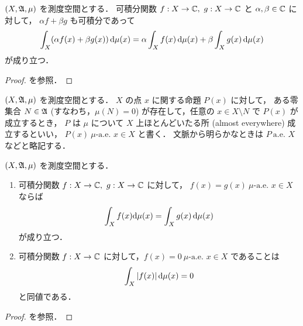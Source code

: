 \begin{theorem}
    $(X,\mathfrak{A},\mu)$ を測度空間とする．
    可積分関数 $f:X\to\Cbb,\ g:X\to\Cbb$ と $\alpha,\beta\in\mathbb{C}$ に対して，
    $\alpha f+\beta g$ も可積分であって
    \begin{align*}
        \int_X(\alpha f(x)+\beta g(x))\,\mathrm{d}\mu(x)
        =\alpha\int_Xf(x)\,\mathrm{d}\mu(x)+\beta\int_Xg(x)\,\mathrm{d}\mu(x)
    \end{align*}
    が成り立つ．
\end{theorem}

\begin{proof}
    \cite[定理 12.3, 系 1]{It63} を参照．
\end{proof}

\begin{definition}
    $(X,\mathfrak{A},\mu)$ を測度空間とする．
    $X$ の点 $x$ に関する命題 $P(x)$ に対して，
    ある零集合 $N\in\mathfrak{A}$ (すなわち，$\mu(N)=0$) が存在して，任意の $x\in X\setminus N$ で $P(x)$ が成立するとき，
    $P$ は $\mu$ について $X$ 上ほとんどいたる所 (almost everywhere) 成立するといい，
    $P(x)\ \textrm{$\mu$-a.e.\ $x\in X$}$ と書く．
    文脈から明らかなときは $P\ \textrm{a.e.\ $X$}$ などと略記する．
\end{definition}

\begin{theorem}
    $(X,\mathfrak{A},\mu)$ を測度空間とする．
    \begin{enumerate}
        \item 可積分関数 $f:X\to\Cbb,\ g:X\to\Cbb$ に対して，
            $f(x)=g(x)\ \textrm{$\mu$-a.e.\ $x\in X$}$ ならば
            \begin{align*}
                \int_Xf(x)\mathrm{d}\mu(x)=\int_Xg(x)\,\mathrm{d}\mu(x)
            \end{align*}
            が成り立つ．
        \item 可積分関数 $f:X\to\mathbb{C}$ に対して，$f(x)=0\ \textrm{$\mu$-a.e.\ $x\in X$}$ であることは
            \begin{align*}
                \int_X|f(x)|\,\mathrm{d}\mu(x)=0
            \end{align*}
            と同値である．
    \end{enumerate}
\end{theorem}

\begin{proof}
    \cite[定理 12.3, 系 2]{It63} を参照．
\end{proof}

